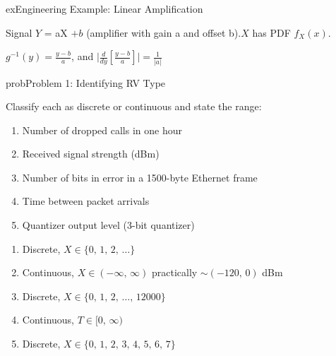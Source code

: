 \begin{PSbox}[unbreakable]{ex}{Engineering Example: Linear Amplification}

Signal $Y$ = aX $+ b$ (amplifier with gain a and offset b).\PSbr{}$X$ has PDF $f_{X}(x)$.

$g^{-1}(y) = \frac{y-b}{a}$, and $\lvert \frac{d}{dy}\left[\frac{y-b}{a}\right]\rvert = \frac{1}{\lvert a\rvert}$


\end{PSbox}


\begin{PSbox}[unbreakable]{prob}{Problem 1: Identifying RV Type}

Classify each as discrete or continuous and state the range:

\begin{enumerate}
\def\labelenumi{(\alph{enumi})}
\tightlist
\item
  Number of dropped calls in one hour
\item
  Received signal strength (dBm)
\item
  Number of bits in error in a 1500-byte Ethernet frame
\item
  Time between packet arrivals
\item
  Quantizer output level (3-bit quantizer)
\end{enumerate}

\PSsolution{} 

\begin{enumerate}
\def\labelenumi{(\alph{enumi})}
\tightlist
\item
  Discrete, $X \in \{0,\, 1,\, 2,\, \ldots \}$
\item
  Continuous, $X \in (-\infty,\, \infty)$ practically $\sim (-120,\, 0)$ dBm
\item
  Discrete, $X \in \{0,\, 1,\, 2,\, \ldots,\, 12000\}$
\item
  Continuous, $T \in [0,\, \infty)$
\item
  Discrete, $X \in \{0,\, 1,\, 2,\, 3,\, 4,\, 5,\, 6,\, 7\}$
\end{enumerate}

\end{PSbox}

